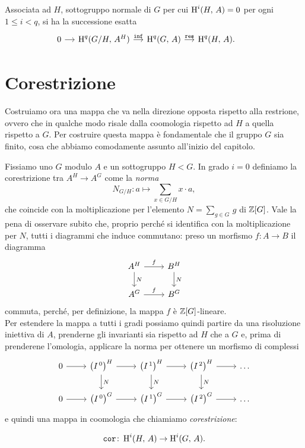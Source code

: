 \begin{corollary}
	Associata ad $ H $, sottogruppo normale di $ G $ per cui $ \operatorname{H}^i(H, \, A ) = 0 $ per ogni $ 1 \leq i < q $, si ha la successione esatta
	\[\begin{tikzcd}[column sep = small]
	0 \rar & \HH^q(G/H, \, A^H) \rar["\Inf"]
	& \HH^q(G, \, A) \rar["\Res"]
	& \HH^q(H, \, A).
	\end{tikzcd} \qquad  \]
\end{corollary}

\section{Corestrizione}
Costruiamo ora una mappa che va nella direzione opposta rispetto alla restrione, ovvero che in qualche modo risale dalla coomologia rispetto ad $ H $ a quella rispetto a $ G $. Per costruire questa mappa è fondamentale che il gruppo $ G $ sia finito, cosa che abbiamo comodamente assunto all'inizio del capitolo.

\begin{definition}[Corestrizione]
Fissiamo uno $ G $ modulo $ A $ e un sottogruppo $ H < G $. In grado $ i = 0 $ definiamo la corestrizione tra $ A^H \to A^G $  come la \emph{norma}
\[N_{G/H} \colon a \mapsto \sum_{x \in G/H} x \cdot a, \]
che coincide con la moltiplicazione per l'elemento $ N = \sum_{g \in G} \, g $ di $ \mathbb{Z}[G] $. Vale la pena di osservare subito che, proprio perché si identifica con la moltiplicazione per $ N $, tutti i diagrammi che induce commutano: preso un morfismo $ f \colon A \to B $ il diagramma
\[\begin{tikzcd}
A^H \rar["f"] \dar{N} 
& B^H \arrow[d, "N"]\\
A^G \rar["f"]
& B^G
\end{tikzcd}\] 
commuta, perché, per definizione, la mappa $ f $ è $ \mathbb{Z}[G] $-lineare. \\

Per estendere la mappa a tutti i gradi possiamo quindi partire da una risoluzione iniettiva di $ A $, prenderne gli invarianti sia rispetto ad $ H $ che a $ G $ e, prima di prenderene l'omologia, applicare la norma per ottenere un morfismo di complessi
\[\begin{tikzcd}
0 \rar
& \left(I^{\,0}\right)^H \rar \dar["N"]
& \left(I^{\,1}\right)^H \rar \dar["N"]
& \left(I^{\,2}\right)^H \rar \dar["N"]
& \dots \\
0 \rar
& \left(I^{\,0}\right)^{G} \rar
& \left(I^{\,1}\right)^{G} \rar
& \left(I^{\,2}\right)^{G} \rar
& \dots
\end{tikzcd} \]
e quindi una mappa in coomologia che chiamiamo \emph{corestrizione}:

\[ \operatorname{\mathtt{cor}} \colon \operatorname{H}^i(H, \, A) \to \operatorname{H}^i(G, \, A). \]

\end{definition}

